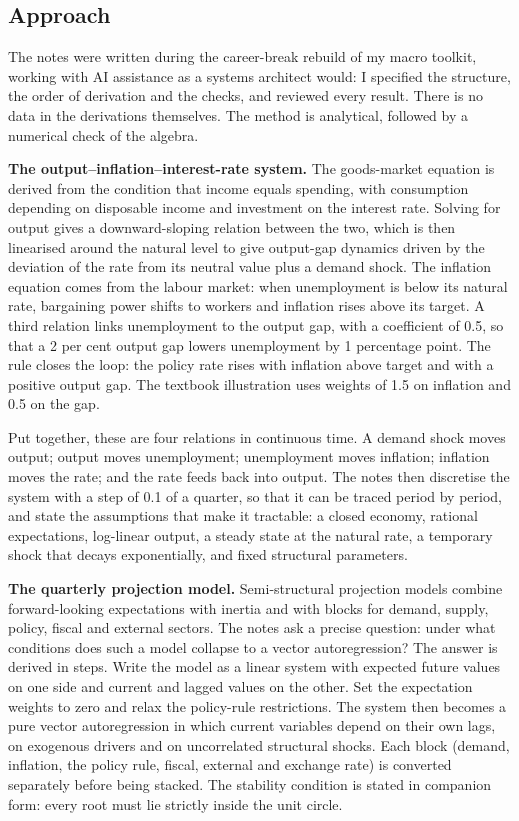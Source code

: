 \documentclass[
  british,
  a4paper,
]{article}
\begin{document}
\subsection{Approach}\label{approach}

The notes were written during the career-break rebuild of my macro
toolkit, working with AI assistance as a systems architect would: I
specified the structure, the order of derivation and the checks, and
reviewed every result. There is no data in the derivations themselves.
The method is analytical, followed by a numerical check of the algebra.

\textbf{The output--inflation--interest-rate system.} The goods-market
equation is derived from the condition that income equals spending, with
consumption depending on disposable income and investment on the
interest rate. Solving for output gives a downward-sloping relation
between the two, which is then linearised around the natural level to
give output-gap dynamics driven by the deviation of the rate from its
neutral value plus a demand shock. The inflation equation comes from the
labour market: when unemployment is below its natural rate, bargaining
power shifts to workers and inflation rises above its target. A third
relation links unemployment to the output gap, with a coefficient of
0.5, so that a 2 per cent output gap lowers unemployment by 1 percentage
point. The rule closes the loop: the policy rate rises with inflation
above target and with a positive output gap. The textbook illustration
uses weights of 1.5 on inflation and 0.5 on the gap.

Put together, these are four relations in continuous time. A demand
shock moves output; output moves unemployment; unemployment moves
inflation; inflation moves the rate; and the rate feeds back into
output. The notes then discretise the system with a step of 0.1 of a
quarter, so that it can be traced period by period, and state the
assumptions that make it tractable: a closed economy, rational
expectations, log-linear output, a steady state at the natural rate, a
temporary shock that decays exponentially, and fixed structural
parameters.

\textbf{The quarterly projection model.} Semi-structural projection
models combine forward-looking expectations with inertia and with blocks
for demand, supply, policy, fiscal and external sectors. The notes ask a
precise question: under what conditions does such a model collapse to a
vector autoregression? The answer is derived in steps. Write the model
as a linear system with expected future values on one side and current
and lagged values on the other. Set the expectation weights to zero and
relax the policy-rule restrictions. The system then becomes a pure
vector autoregression in which current variables depend on their own
lags, on exogenous drivers and on uncorrelated structural shocks. Each
block (demand, inflation, the policy rule, fiscal, external and exchange
rate) is converted separately before being stacked. The stability
condition is stated in companion form: every root must lie strictly
inside the unit circle.
\end{document}
